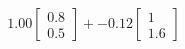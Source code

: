 \documentclass[preview]{standalone}
\begin{document}
\begin{align*}
1.00 \begin{bmatrix} 0.8 \\ 0.5 \end{bmatrix} + -0.12 \begin{bmatrix} 1 \\ 1.6 \end{bmatrix}
\end{align*}
\end{document}
